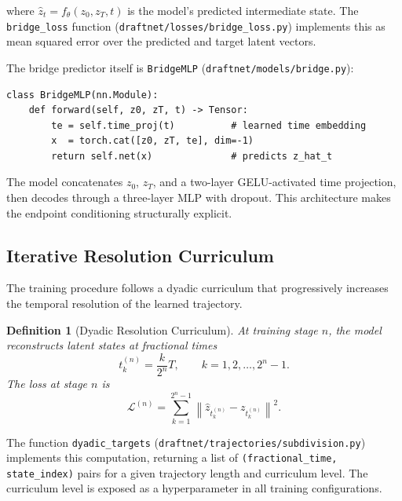 \documentclass[12pt,a4paper]{article}
\theoremstyle{draftthm}
\newtheorem{definition}{Definition}[section]
\newcommand{\norm}[1]{\left\|#1\right\|}
\newcommand{\code}[1]{\texttt{\small #1}}
\begin{document}
where $\hat{z}_t = f_{\theta}(z_0, z_T, t)$ is the model's predicted intermediate state. The \code{bridge\_loss} function (\code{draftnet/losses/bridge\_loss.py}) implements this as mean squared error over the predicted and target latent vectors.

The bridge predictor itself is \code{BridgeMLP} (\code{draftnet/models/bridge.py}):

\begin{lstlisting}
class BridgeMLP(nn.Module):
    def forward(self, z0, zT, t) -> Tensor:
        te = self.time_proj(t)          # learned time embedding
        x  = torch.cat([z0, zT, te], dim=-1)
        return self.net(x)              # predicts z_hat_t
\end{lstlisting}

The model concatenates $z_0$, $z_T$, and a two-layer GELU-activated time projection, then decodes through a three-layer MLP with dropout. This architecture makes the endpoint conditioning structurally explicit.

\subsection{Iterative Resolution Curriculum}

The training procedure follows a dyadic curriculum that progressively increases the temporal resolution of the learned trajectory.

\begin{definition}[Dyadic Resolution Curriculum]
  At training stage $n$, the model reconstructs latent states at fractional times
  \begin{equation}
    t_k^{(n)} = \frac{k}{2^n} T, \qquad k = 1, 2, \dots, 2^n - 1.
  \end{equation}
  The loss at stage $n$ is
  \begin{equation}
    \mathcal{L}^{(n)}
    =
    \sum_{k=1}^{2^n - 1}
    \norm{\hat{z}_{t_k^{(n)}} - z_{t_k^{(n)}}}^2.
    \label{eq:dyadic-loss}
  \end{equation}
\end{definition}

The function \code{dyadic\_targets} (\code{draftnet/trajectories/subdivision.py}) implements this computation, returning a list of \code{(fractional\_time, state\_index)} pairs for a given trajectory length and curriculum level. The curriculum level is exposed as a hyperparameter in all training configurations.
\end{document}

